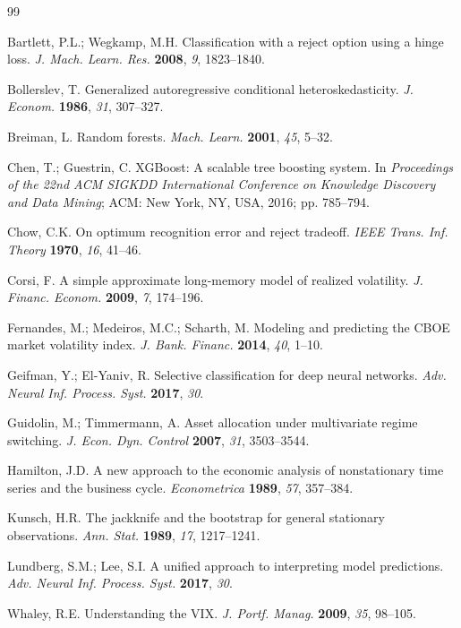 \documentclass[12pt]{article}
\begin{document}

\begin{thebibliography}{99}

Bartlett, P.L.; Wegkamp, M.H.
Classification with a reject option using a hinge loss.
\textit{J. Mach. Learn. Res.} \textbf{2008}, \textit{9}, 1823--1840.

Bollerslev, T.
Generalized autoregressive conditional heteroskedasticity.
\textit{J. Econom.} \textbf{1986}, \textit{31}, 307--327.

Breiman, L.
Random forests.
\textit{Mach. Learn.} \textbf{2001}, \textit{45}, 5--32.

Chen, T.; Guestrin, C.
XGBoost: A scalable tree boosting system.
In \textit{Proceedings of the 22nd ACM SIGKDD International Conference on Knowledge Discovery
and Data Mining}; ACM: New York, NY, USA, 2016; pp. 785--794.

Chow, C.K.
On optimum recognition error and reject tradeoff.
\textit{IEEE Trans. Inf. Theory} \textbf{1970}, \textit{16}, 41--46.

Corsi, F.
A simple approximate long-memory model of realized volatility.
\textit{J. Financ. Econom.} \textbf{2009}, \textit{7}, 174--196.

Fernandes, M.; Medeiros, M.C.; Scharth, M.
Modeling and predicting the CBOE market volatility index.
\textit{J. Bank. Financ.} \textbf{2014}, \textit{40}, 1--10.

Geifman, Y.; El-Yaniv, R.
Selective classification for deep neural networks.
\textit{Adv. Neural Inf. Process. Syst.} \textbf{2017}, \textit{30}.

Guidolin, M.; Timmermann, A.
Asset allocation under multivariate regime switching.
\textit{J. Econ. Dyn. Control} \textbf{2007}, \textit{31}, 3503--3544.

Hamilton, J.D.
A new approach to the economic analysis of nonstationary time series and the business cycle.
\textit{Econometrica} \textbf{1989}, \textit{57}, 357--384.

Kunsch, H.R.
The jackknife and the bootstrap for general stationary observations.
\textit{Ann. Stat.} \textbf{1989}, \textit{17}, 1217--1241.

Lundberg, S.M.; Lee, S.I.
A unified approach to interpreting model predictions.
\textit{Adv. Neural Inf. Process. Syst.} \textbf{2017}, \textit{30}.

Whaley, R.E.
Understanding the VIX.
\textit{J. Portf. Manag.} \textbf{2009}, \textit{35}, 98--105.

\end{thebibliography}
\end{document}
